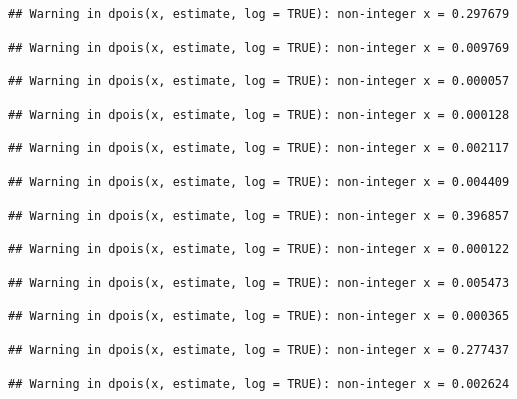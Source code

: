 \documentclass[]{article}
\begin{document}
\begin{verbatim}
## Warning in dpois(x, estimate, log = TRUE): non-integer x = 0.297679
\end{verbatim}

\begin{verbatim}
## Warning in dpois(x, estimate, log = TRUE): non-integer x = 0.009769
\end{verbatim}

\begin{verbatim}
## Warning in dpois(x, estimate, log = TRUE): non-integer x = 0.000057
\end{verbatim}

\begin{verbatim}
## Warning in dpois(x, estimate, log = TRUE): non-integer x = 0.000128
\end{verbatim}

\begin{verbatim}
## Warning in dpois(x, estimate, log = TRUE): non-integer x = 0.002117
\end{verbatim}

\begin{verbatim}
## Warning in dpois(x, estimate, log = TRUE): non-integer x = 0.004409
\end{verbatim}

\begin{verbatim}
## Warning in dpois(x, estimate, log = TRUE): non-integer x = 0.396857
\end{verbatim}

\begin{verbatim}
## Warning in dpois(x, estimate, log = TRUE): non-integer x = 0.000122
\end{verbatim}

\begin{verbatim}
## Warning in dpois(x, estimate, log = TRUE): non-integer x = 0.005473
\end{verbatim}

\begin{verbatim}
## Warning in dpois(x, estimate, log = TRUE): non-integer x = 0.000365
\end{verbatim}

\begin{verbatim}
## Warning in dpois(x, estimate, log = TRUE): non-integer x = 0.277437
\end{verbatim}

\begin{verbatim}
## Warning in dpois(x, estimate, log = TRUE): non-integer x = 0.002624
\end{verbatim}
\end{document}
